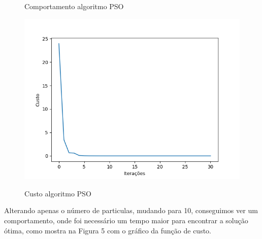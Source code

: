 \documentclass[conference]{IEEEtran}
\begin{document}
\begin{figure}[htbp]
\begin{center}
    \caption{Comportamento algoritmo PSO} \label{gdimotes}
    \includegraphics[scale=0.5]{imagens-pso/particle-swarm-optimization-cost.png}
    \caption{Custo algoritmo PSO} \label{gdimotes}
    \end{center}
    \end{figure}

\vspace*{1cm}
    Alterando apenas o número de particulas, mudando para 10, conseguimos ver um comportamento, onde foi necessário um tempo maior para encontrar a solução ótima, como mostra na Figura 5 com o gráfico da função de custo.
\end{document}
